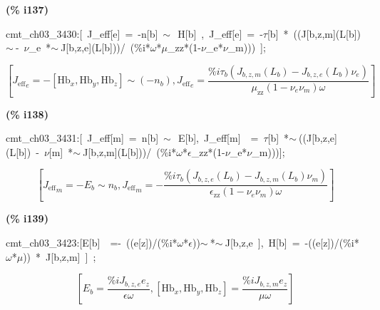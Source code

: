 \documentclass[fleqn]{article}
\begin{document}
\noindent
\begin{minipage}[t]{4.000000em}\color{red}\bfseries
(\% i137)	
\end{minipage}
\begin{minipage}[t]{\textwidth}\color{blue}
cmt\_ch03\_3430:[\ J\_eff[e]\ =\ -n[b]\ \ensuremath{\sim\ }\ H[b]\ ,\ J\_eff[e]\ =\ -\ensuremath{\tau}[b]\ *\ ((J[b,z,m](L[b])\ensuremath{\sim\ }-\ \ensuremath{\nu}\_e\ *\ensuremath{\sim\ }J[b,z,e](L[b]))/\ (\%i*\ensuremath{\omega}*\ensuremath{\mu}\_zz*(1-\ensuremath{\nu}\_e*\ensuremath{\nu}\_m)))\ ];
\end{minipage}
\[\displaystyle \tag{cmt\_ ch03\_ 3430} 
\left[ {{{J_{\ensuremath{\mathrm{eff}}}}}_e}=-\left[ {{\ensuremath{\mathrm{Hb}}}_x}\operatorname{,}{{\ensuremath{\mathrm{Hb}}}_y}\operatorname{,}{{\ensuremath{\mathrm{Hb}}}_z}\right] \operatorname{\sim  }\left( -{n_b}\right) \operatorname{,}{{{J_{\ensuremath{\mathrm{eff}}}}}_e}=\frac{\% i {{\tau }_b} \left( {J_{b,z,m}}\left( {L_b}\right) -{J_{b,z,e}}\left( {L_b}\right)  {{\nu }_e}\right) }{{{\mu }_{\ensuremath{\mathrm{zz}}}} \left( 1-{{\nu }_e} {{\nu }_m}\right)  \omega }\right] \mbox{}
\]


\noindent
\begin{minipage}[t]{4.000000em}\color{red}\bfseries
(\% i138)	
\end{minipage}
\begin{minipage}[t]{\textwidth}\color{blue}
cmt\_ch03\_3431:[\ J\_eff[m]\ =\ n[b]\ \ensuremath{\sim\ }\ E[b],\ J\_eff[m]\ \ =\ \ensuremath{\tau}[b]\ *\ensuremath{\sim\ }((J[b,z,e](L[b])\ -\ \ensuremath{\nu}[m]\ *\ensuremath{\sim\ }J[b,z,m](L[b]))/\ (\%i*\ensuremath{\omega}*\ensuremath{\epsilon}\_zz*(1-\ensuremath{\nu}\_e*\ensuremath{\nu}\_m)))];
\end{minipage}
\[\displaystyle \tag{cmt\_ ch03\_ 3431} 
\left[ {{{J_{\ensuremath{\mathrm{eff}}}}}_m}=-{E_b}\operatorname{\sim  }{n_b}\operatorname{,}{{{J_{\ensuremath{\mathrm{eff}}}}}_m}=-\frac{\% i {{\tau }_b} \left( {J_{b,z,e}}\left( {L_b}\right) -{J_{b,z,m}}\left( {L_b}\right)  {{\nu }_m}\right) }{{{\epsilon }_{\ensuremath{\mathrm{zz}}}} \left( 1-{{\nu }_e} {{\nu }_m}\right)  \omega }\right] \mbox{}
\]


\noindent
\begin{minipage}[t]{4.000000em}\color{red}\bfseries
(\% i139)	
\end{minipage}
\begin{minipage}[t]{\textwidth}\color{blue}
cmt\_ch03\_3423:[E[b]\ \ =-\ ((e[z])/(\%i*\ensuremath{\omega}*\ensuremath{\epsilon}))\ensuremath{\sim\ }*\ensuremath{\sim\ }J[b,z,e\ ],\ H[b]\ =\ -((e[z])/(\%i*\ensuremath{\omega}*\ensuremath{\mu}))\ *\ J[b,z,m]\ ]\ ;
\end{minipage}
\[\displaystyle \tag{cmt\_ ch03\_ 3423} 
\left[ {E_b}=\frac{\% i {J_{b,z,e}} {e_z}}{\epsilon  \omega }\operatorname{,}\left[ {{\ensuremath{\mathrm{Hb}}}_x}\operatorname{,}{{\ensuremath{\mathrm{Hb}}}_y}\operatorname{,}{{\ensuremath{\mathrm{Hb}}}_z}\right] =\frac{\% i {J_{b,z,m}} {e_z}}{\mu  \omega }\right] \mbox{}
\]
\end{document}
